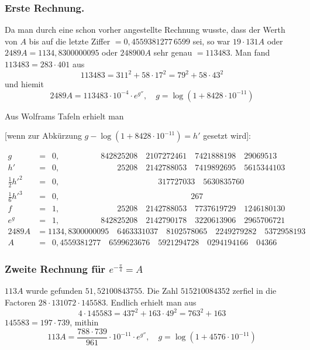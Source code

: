 \documentclass[10pt,a4paper]{article}
\begin{document}
\subsubsection*{Erste Rechnung.}

Da man durch eine schon vorher angestellte Rechnung wusste, dass der
Werth von $A$ bis auf die letzte Ziffer $=0{,}4559381277\,6599$ sei, so war
$19\cdot131A$ oder $2489A = 1134{,}8300000095$ oder $248900A$ sehr genau $=113483$.
Man fand $113483 = 283\cdot401$ aus
\[
113483 = 311^2+58\cdot17^2 = 79^2+58\cdot43^2
\]
und hiemit
\[
2489A = 113483\cdot10^{-4}\cdot e^{g''}, \quad g = \log(1+8428\cdot10^{-11})
\]

Aus Wolframs Tafeln erhielt man

[wenn zur Abkürzung $g-\log(1+8428\cdot10^{-11})=h'$ gesetzt wird]:

\begin{align*}
g &= \phantom{0}0{,}\phantom{0000000000}842825208\quad 2107272461\quad 7421888198\quad 29069513\\
h' &= \phantom{0}0{,}\phantom{00000000000000}25208\quad 2142788053\quad 7419892695\quad 5615344103\\
\tfrac12h'^2 &= \phantom{0}0{,}\phantom{000000000000000000000000}317727033\quad 5630835760\\
\tfrac16h'^3 &= \phantom{0}0{,}\phantom{00000000000000000000000000000000}267\\
f &= \phantom{0}1{,}\phantom{00000000000000}25208\quad 2142788053\quad 7737619729\quad 1246180130\\
e^g &= \phantom{0}1{,}\phantom{0000000000}842825208\quad 2142790178\quad 3220613906\quad 2965706721\\
2489A &= 1134{,}8300000095\quad 6463331037\quad 8102578065\quad 2249279282\quad 5372958193\\
A &= \phantom{0}0{,}4559381277\quad 6599623676\quad 5921294728\quad 0294194166\quad 04366
\end{align*}

\subsubsection*{Zweite Rechnung für \texorpdfstring{$e^{-\frac{\pi}{4}}=A$}{e\^{}(-pi/4)=A}}

$113A$ wurde gefunden $51{,}52100843755$. Die Zahl $515210084352$ zerfiel in die Factoren $28\cdot131072\cdot145583$. Endlich erhielt man aus
\[
4\cdot145583 = 437^2+163\cdot49^2 = 763^2+163
\]
$145583 = 197\cdot739$, mithin
\[
113A = \frac{788\cdot739}{961}\cdot10^{-11}\cdot e^{g''}, \quad g=\log(1+4576\cdot10^{-11})
\]
\end{document}
